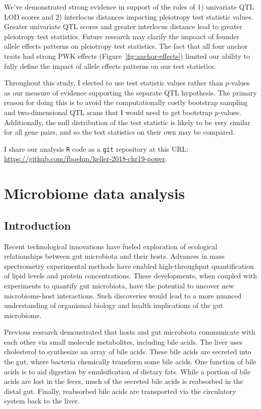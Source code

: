 \documentclass[oneside]{book}\usepackage[]{graphicx}\usepackage[]{color}
\begin{document}
We've demonstrated strong evidence in support of the roles of 1) univariate QTL LOD scores and
2) interlocus distances impacting pleiotropy test statistic values. 
Greater univariate QTL scores and greater interlocus distance lead to greater pleiotropy test statistics. 
Future research may clarify the impoact of founder allele effects patterns on pleiotropy test statistics. 
The fact that all four anchor traits had strong PWK effects (Figure~\ref{fig:anchor-effects}) limited
our ability to fully define the impact of allele effects patterns on our test statistics.

Throughout this study, I elected to use test statistic values rather than $p$-values as 
our measure of evidence supporting the separate QTL hypothesis.
The primary reason for doing this is to avoid the computationally costly bootstrap
sampling and two-dimensional QTL scans that I would need to get bootstrap $p$-values. Additionally, the null distribution of the test statistic is likely to be very similar for all gene pairs, and so the test statistics on their own may be compared.

I share our analysis \texttt{R} code \citep{r} as a \texttt{git}
repository at this URL: \url{https://github.com/fboehm/keller-2018-chr19-power}.




\section{Microbiome data analysis}\label{sec:microbiome}
\subsection{Introduction}

Recent technological innovations have fueled exploration of ecological relationships between gut microbiota and their hosts. 
Advances in mass spectrometry experimental methods have enabled high-throughput quantification of lipid levels and protein concentrations. 
These developments, when coupled with experiments to quantify gut microbiota, have the potential to uncover new microbiome-host interactions. 
Such discoveries would lead to a more nuanced understanding of organismal biology and health implications of the gut microbiome. 

Previous research demonstrated that hosts and gut microbiota communicate 
with each other via small molecule metabolites, including bile acids. 
The liver uses cholesterol to synthesize an array of bile acids. 
These bile acids are secreted into the gut, where bacteria chemically transform some bile acids. 
One function of bile acids is to aid digestion by emulsification of dietary fats. 
While a portion of bile acids are lost in the feces, much of the secreted bile acids is reabsorbed in the distal gut. 
Finally, reabsorbed bile acids are transported via the circulatory system back to the liver.
\end{document}
